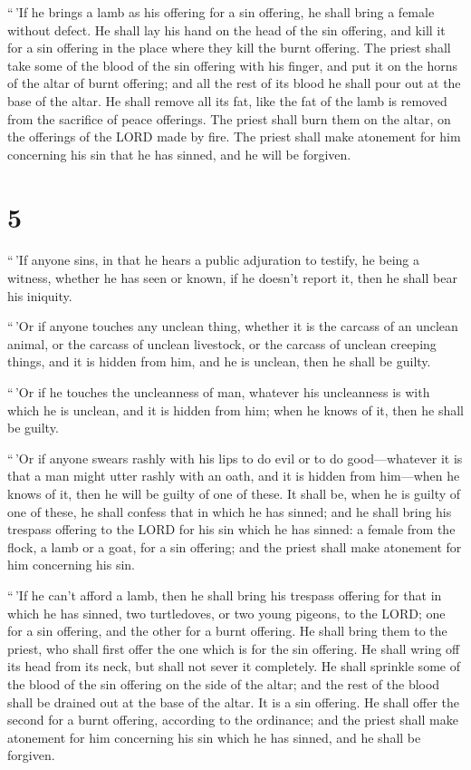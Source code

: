  ``\,'If he brings a lamb as his offering for a sin
offering, he shall bring a female without defect.  He
shall lay his hand on the head of the sin offering, and kill it for a
sin offering in the place where they kill the burnt offering.
 The priest shall take some of the blood of the sin
offering with his finger, and put it on the horns of the altar of burnt
offering; and all the rest of its blood he shall pour out at the base of
the altar.  He shall remove all its fat, like the fat of
the lamb is removed from the sacrifice of peace offerings. The priest
shall burn them on the altar, on the offerings of the LORD made by fire.
The priest shall make atonement for him concerning his sin that he has
sinned, and he will be forgiven.

\hypertarget{section-4}{%
\section{5}\label{section-4}}

 ``\,'If anyone sins, in that he hears a public adjuration
to testify, he being a witness, whether he has seen or known, if he
doesn't report it, then he shall bear his iniquity.

 ``\,'Or if anyone touches any unclean thing, whether it
is the carcass of an unclean animal, or the carcass of unclean
livestock, or the carcass of unclean creeping things, and it is hidden
from him, and he is unclean, then he shall be guilty.

 ``\,'Or if he touches the uncleanness of man, whatever
his uncleanness is with which he is unclean, and it is hidden from him;
when he knows of it, then he shall be guilty.

 ``\,'Or if anyone swears rashly with his lips to do evil
or to do good---whatever it is that a man might utter rashly with an
oath, and it is hidden from him---when he knows of it, then he will be
guilty of one of these.  It shall be, when he is guilty of
one of these, he shall confess that in which he has sinned;
 and he shall bring his trespass offering to the LORD for
his sin which he has sinned: a female from the flock, a lamb or a goat,
for a sin offering; and the priest shall make atonement for him
concerning his sin.

 ``\,'If he can't afford a lamb, then he shall bring his
trespass offering for that in which he has sinned, two turtledoves, or
two young pigeons, to the LORD; one for a sin offering, and the other
for a burnt offering.  He shall bring them to the priest,
who shall first offer the one which is for the sin offering. He shall
wring off its head from its neck, but shall not sever it completely.
 He shall sprinkle some of the blood of the sin offering
on the side of the altar; and the rest of the blood shall be drained out
at the base of the altar. It is a sin offering.  He shall
offer the second for a burnt offering, according to the ordinance; and
the priest shall make atonement for him concerning his sin which he has
sinned, and he shall be forgiven.

